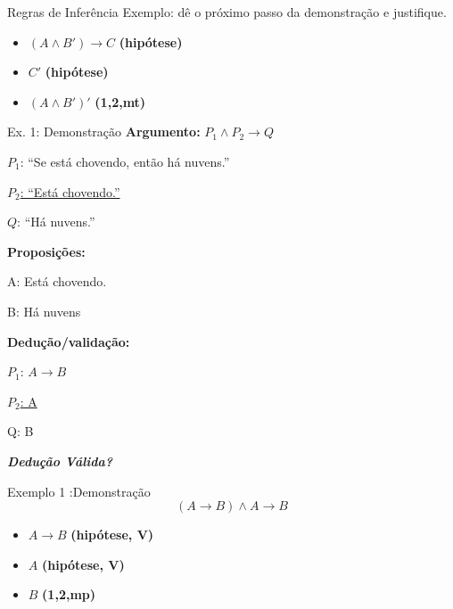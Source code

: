 \documentclass[aspectratio=169]{beamer}
\begin{document}
\begin{frame}{Regras de Inferência}
    Exemplo: dê o próximo passo da demonstração e justifique.
    \vspace{4mm}

    \begin{itemize}
        \item $(A \wedge B') \rightarrow C$ \textbf{(hipótese)}
        \item $C'$ \textbf{(hipótese)}
        \item $ (A \wedge B')' $ \textbf{(1,2,mt)}
    \end{itemize}
\end{frame}

\begin{frame}{Ex. 1: Demonstração}
    \textbf{Argumento:} $P_1 \wedge P_2 \rightarrow Q$

    $P_1$: ``Se está chovendo, então há nuvens.''

    \underline{$P_2$: ``Está chovendo.''}

    $Q$: ``Há nuvens.''

    \vspace{3mm}
    \textbf{Proposições:}

    A: Está chovendo.

    B: Há nuvens
    \vspace{3mm}

    \textbf{Dedução/validação:}

    $P_1$: $A \rightarrow B$

    \underline{$P_2$: A}

    Q: B
    \vspace{4mm}

    \textit{\textbf{Dedução Válida?}}


\end{frame}


\begin{frame}{Exemplo 1 :Demonstração}
    \[ (A \rightarrow B ) \wedge A \rightarrow B \]

    \begin{itemize}
        \item $A \rightarrow B$ \textbf{(hipótese, V)}
        \item $A$ \textbf{(hipótese, V)}
        \item $ B $ \textbf{(1,2,mp)}
    \end{itemize}
\end{frame}
\end{document}
